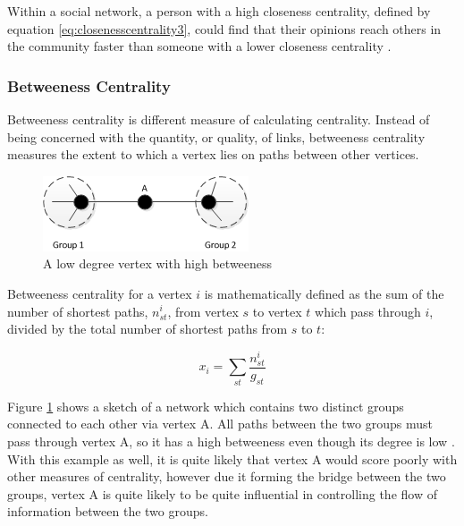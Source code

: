 Within a social network, a person with a high closeness centrality, defined by equation \ref{eq:closenesscentrality3}, could find that their opinions reach others in the community faster than someone with a lower closeness centrality \cite{newman10}.

\subsubsection{Betweeness Centrality}
Betweeness centrality is different measure of calculating centrality. Instead of being concerned with the quantity, or quality, of links, betweeness centrality measures the extent to which a vertex lies on paths between other vertices.

\begin{figure}%
\centering
\includegraphics[width=0.4\columnwidth]{./img/betweenesscentrality}%
\caption{A low degree vertex with high betweeness \cite{newman10}}%
\label{fig:betweenesscentrality}%
\end{figure}

Betweeness centrality for a vertex $i$ is mathematically defined as the sum of the number of shortest paths, $n_{st}^{i}$, from vertex $s$ to vertex $t$ which pass through $i$, divided by the total number of shortest paths from $s$ to $t$:

\begin{equation}
x_i = \sum_{st} \frac{n_{st}^{i}}{g_{st}}
\label{eq:betweenesscentrality}
\end{equation}

Figure \ref{fig:betweenesscentrality} shows a sketch of a network which contains two distinct groups connected to each other via vertex A. All paths between the two groups must pass through vertex A, so it has a high betweeness even though its degree is low \cite{newman10}. With this example as well, it is quite likely that vertex A would score poorly with other measures of centrality, however due it forming the bridge between the two groups, vertex A is quite likely to be quite influential in controlling the flow of information between the two groups.